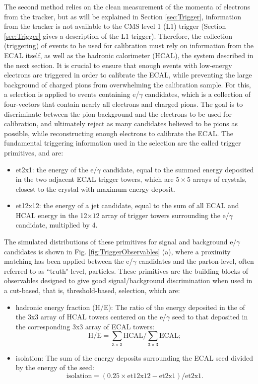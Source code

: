 The second method relies on the clean measurement of the momenta of electrons from the tracker, but as will be explained in Section \ref{sec:Trigger}, information from the tracker is not available to the CMS level 1 (L1) trigger (Section \ref{sec:Trigger} gives a description of the L1 trigger). Therefore, the collection (triggering) of events to be used for calibration must rely on information from the ECAL itself, as well as the hadronic calorimeter (HCAL), the system described in the next section. It is crucial to ensure that enough events with low-energy electrons are triggered in order to calibrate the ECAL, while preventing the large background of charged pions from overwhelming the calibration sample. For this, a selection is applied to events containing e/$\gamma$ candidates, which is a collection of four-vectors that contain nearly all electrons and charged pions. The goal is to discriminate between the pion background and the electrons to be used for calibration, and ultimately reject as many candidates believed to be pions as possible, while reconstructing enough electrons to calibrate the ECAL. The fundamental triggering information used in the selection are the called trigger primitives, and are:
\begin{itemize}
\item et2x1: the energy of the e/$\gamma$ candidate, equal to the summed energy deposited in the two adjacent ECAL trigger towers, which are $5\times5$ arrays of crystals, closest to the crystal with maximum energy deposit.
\item et12x12: the energy of a jet candidate, equal to the sum of all ECAL and HCAL energy in the 12$\times12$ array of trigger towers surrounding the e/$\gamma$ candidate, multiplied by 4.
\end{itemize}
The simulated distributions of these primitives for signal and background e/$\gamma$ candidates is shown in Fig. \ref{fig:TriggerObservables} (a), where a proximity matching has been applied between the e/$\gamma$ candidates and the parton-level, often referred to as ``truth"-level, particles.  These primitives are the building blocks of observables designed to give good signal/background discrimination when used in a cut-based, that is, threshold-based, selection, which are:
\begin{itemize}
\item hadronic energy fraction (H/E): The ratio of the energy deposited in the of the 3x3 array of HCAL towers centered on the e/$\gamma$ seed to that deposited in the corresponding 3x3 array of ECAL towers:
\begin{equation}
\text{H/E} = \sum_{3\times3}{\text{HCAL}}/\sum_{3\times3}\text{ECAL};
\end{equation}
\item isolation: The sum of the energy deposits surrounding the ECAL seed divided by the energy of the seed:
\begin{equation}
\text{isolation} = (0.25\times\text{et12x12} - \text{et2x1})/\text{et2x1}.
\end{equation}
\end{itemize}
